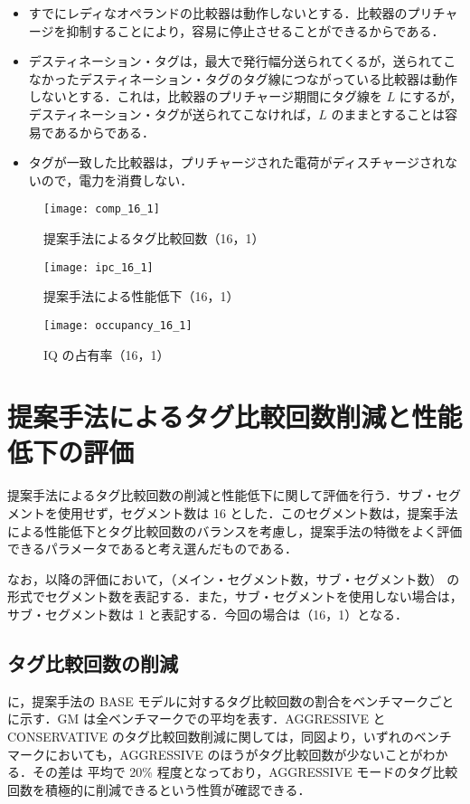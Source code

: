 \begin{itemize}
  \item すでにレディなオペランドの比較器は動作しないとする．比較器のプリチャージを抑制することにより，容易に停止させることができるからである．
  \item デスティネーション・タグは，最大で発行幅分送られてくるが，送られてこなかったデスティネーション・タグのタグ線につながっている比較器は動作しないとする．これは，比較器のプリチャージ期間にタグ線を $L$ にするが，デスティネーション・タグが送られてこなければ，$L$ のままとすることは容易であるからである．
  \item タグが一致した比較器は，プリチャージされた電荷がディスチャージされないので，電力を消費しない．
\end{itemize}

\begin{figure}[htb]
  \centering
  \texttt{[image: comp\_16\_1]}
  \caption{提案手法によるタグ比較回数（16，1）}
  \label{fig:comp_16_1}
\end{figure}
\begin{figure}[htb]
  \centering
  \texttt{[image: ipc\_16\_1]}
  \caption{提案手法による性能低下（16，1）}
  \label{fig:ipc_16_1}
\end{figure}
\begin{figure}[htb]
  \centering
  \texttt{[image: occupancy\_16\_1]}
  \caption{IQ の占有率（16，1）}
  \label{fig:occupancy_16_1}
\end{figure}

\section{提案手法によるタグ比較回数削減と性能低下の評価}
\label{sec:eval_segIQ}
提案手法によるタグ比較回数の削減と性能低下に関して評価を行う．サブ・セグメントを使用せず，セグメント数は 16 とした．このセグメント数は，提案手法による性能低下とタグ比較回数のバランスを考慮し，提案手法の特徴をよく評価できるパラメータであると考え選んだものである．

なお，以降の評価において，（メイン・セグメント数，サブ・セグメント数） の形式でセグメント数を表記する．また，サブ・セグメントを使用しない場合は，サブ・セグメント数は 1 と表記する．今回の場合は（16，1）となる．

\subsection{タグ比較回数の削減}
に，提案手法の BASE モデルに対するタグ比較回数の割合をベンチマークごとに示す．GM は全ベンチマークでの平均を表す．AGGRESSIVE と CONSERVATIVE のタグ比較回数削減に関しては，同図より，いずれのベンチマークにおいても，AGGRESSIVE のほうがタグ比較回数が少ないことがわかる．その差は 平均で 20\% 程度となっており，AGGRESSIVE モードのタグ比較回数を積極的に削減できるという性質が確認できる．

